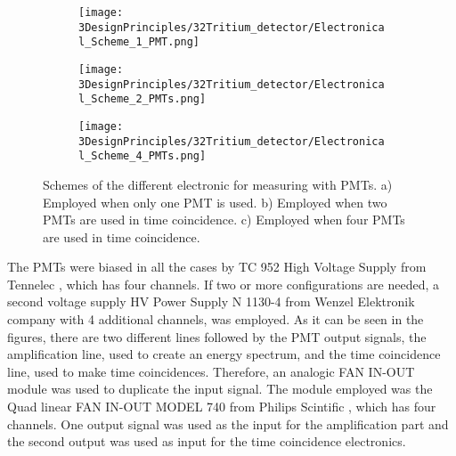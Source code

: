 \begin{figure}
\centering
    \begin{subfigure}[b]{1.0\textwidth}
    \centering
    \texttt{[image: 3DesignPrinciples/32Tritium\_detector/Electronical\_Scheme\_1\_PMT.png]}  
    \caption{\label{subfig:ElectronicConfiguraiton1PMT}}
    \end{subfigure}
    \hfill
    \begin{subfigure}[b]{1.0\textwidth}
    \centering
    \texttt{[image: 3DesignPrinciples/32Tritium\_detector/Electronical\_Scheme\_2\_PMTs.png]}  
    \caption{\label{subfig:ElectronicConfiguraiton2PMT}}
    \end{subfigure}
    \hfill
    \begin{subfigure}[b]{1.0\textwidth}
    \centering
    \texttt{[image: 3DesignPrinciples/32Tritium\_detector/Electronical\_Scheme\_4\_PMTs.png]}  
    \caption{\label{subfig:ElectronicConfiguraiton4PMT}}
    \end{subfigure}
 \caption{Schemes of the different electronic for measuring with PMTs. a) Employed when only one PMT is used. b) Employed when two PMTs are used in time coincidence. c) Employed when four PMTs are used in time coincidence.}
 \label{fig:ElectronicConfiguraitonsPMT}
\end{figure}

The PMTs were biased in all the cases by TC 952 High Voltage Supply from Tennelec \cite{DataSheetHVSupplyTennelec}, which has four channels. If two or more configurations are needed, a second voltage supply HV Power Supply N 1130-4 from Wenzel Elektronik company \cite{DataSheetHVSupplyWenzel} with 4 additional channels, was employed. As it can be seen in the figures, there are two different lines followed by the PMT output signals, the amplification line, used to create an energy spectrum, and the time coincidence line, used to make time coincidences. Therefore, an analogic FAN IN-OUT module was used to duplicate the input signal. The module employed was the Quad linear FAN IN-OUT MODEL 740 from Philips Scintific \cite{DataSheetFANINOUT}, which has four channels. One output signal was used as the input for the amplification part and the second output was used as input for the time coincidence electronics.

